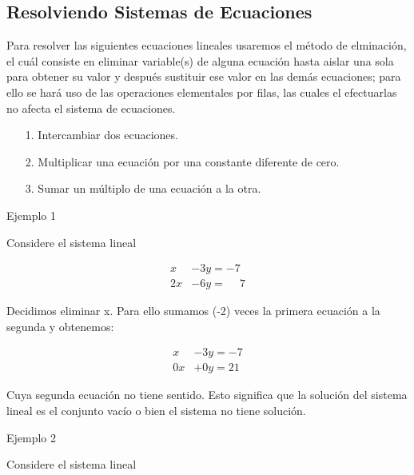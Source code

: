 \documentclass{article}
\begin{document}
\subsection{Resolviendo Sistemas de Ecuaciones}

Para resolver las siguientes ecuaciones lineales usaremos el método de elminación, el cuál consiste en eliminar variable(s) de alguna ecuación hasta aislar una sola para obtener su valor y después sustituir ese valor en las demás ecuaciones; para ello se hará uso de las operaciones elementales por filas, las cuales el efectuarlas no afecta el sistema de ecuaciones. 

\begin{tcolorbox}[colback=blue!10!white,colframe=blue!60!black,title=Operaciones Elementales por filas]
    \begin{itemize}
        \item[1.] Intercambiar dos ecuaciones.
        \item[2.] Multiplicar una ecuación por una constante diferente de cero.
        \item[3.] Sumar un múltiplo de una ecuación a la otra.
    \end{itemize}
\end{tcolorbox}

\begin{large}
    Ejemplo 1
\end{large}
Considere el sistema lineal

\begin{equation*}
    \begin{aligned}
            x &- 3y = -7\\
            2x &-6y = \phantom{-} 7
    \end{aligned}
\end{equation*}

Decidimos eliminar x. Para ello sumamos (-2) veces la primera ecuación a la segunda y obtenemos:

\begin{equation*}
    \begin{aligned}
            x & - 3y = -7\\
            0x & +0y = 21
    \end{aligned}
\end{equation*}

Cuya segunda ecuación no tiene sentido. Esto significa que la solución del sistema lineal es el conjunto vacío o bien el sistema no tiene solución.

\begin{large}
    Ejemplo 2
\end{large}
Considere el sistema lineal
\end{document}
